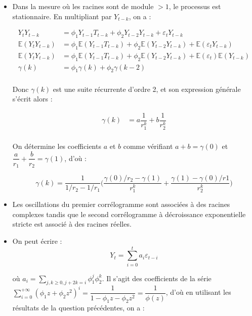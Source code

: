 \documentclass[11pt]{article}
\begin{document}
\begin{solution}  %

    \begin{itemize}
        \item Dans la mesure où les racines sont de module $>1$, le processus est stationnaire. En multipliant par $Y_{t-k}$, on a :
        
        \begin{align*}
            Y_t Y_{t-k} & = \phi_1 Y_{t-1} T_{t-k} + \phi_2 Y_{t-2} Y_{t-k} + \varepsilon_t Y_{t-k}\\
            \mathbb{E}(Y_t Y_{t-k}) & = \phi_1 \mathbb{E}(Y_{t-1} T_{t-k}) + \phi_2 \mathbb{E}(Y_{t-2} Y_{t-k}) + \mathbb{E}(\varepsilon_t Y_{t-k})\\
            \mathbb{E}(Y_t Y_{t-k}) & = \phi_1 \mathbb{E}(Y_{t-1} T_{t-k}) + \phi_2 \mathbb{E}(Y_{t-2} Y_{t-k}) + \mathbb{E}(\varepsilon_t) \mathbb{E}(Y_{t-k})\\
            \gamma(k) & = \phi_1 \gamma(k) + \phi_2 \gamma(k-2)\\
        \end{align*}

        Donc $\gamma(k)$ est une suite récurrente d'ordre 2, et son expression générale s'écrit alors : 

        \begin{align*}
            \gamma(k) & = a\dfrac{1}{r_1^k} + b\dfrac{1}{r_2^k}\\
        \end{align*}
        
        On détermine les coefficients $a$ et $b$ comme vérifiant $ a + b = \gamma(0)$ et $ \dfrac{a}{r_1} + \dfrac{b}{r_2} = \gamma(1)$, d'où : 

        $$ \gamma(k) = \dfrac{1}{1/r_2 - 1/r_1} \big(\dfrac{\gamma(0)/r_2 - \gamma(1)}{r_1^k} + \dfrac{\gamma(1) - \gamma(0)/r1}{r_2^k}\big)$$

        \item Les oscillations du premier corrélogramme sont associées à des racines complexes tandis que le second corrélogramme à décroissance exponentielle stricte est associé à des racines réelles.
    
        \item On peut écrire : 
        $$Y_t = \sum_{i=0}^{t} a_i \varepsilon_{t-i}$$

        où $a_i = \sum_{j,k \geq 0, j+2k = i} \phi_1^j \phi_2^k$. Il s'agit des coefficients de la série $\sum_{i=0}^{+ \infty} (\phi_1 z + \phi_2 z^2)^i = \dfrac{1}{1-\phi_1 z - \phi_2 z^2} = \dfrac{1}{\phi(z)}$, d'où en utilisant les résultats de la question précédentes, on a : 


\end{itemize}
\end{solution}
\end{document}
